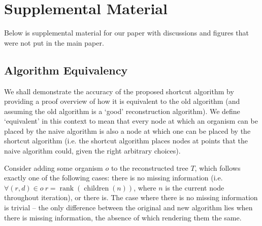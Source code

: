 \appendix
\section*{\Huge Supplemental Material}

\setcounter{section}{0}

\makeatletter
\def\@seccntformat#1{\@ifundefined{#1@cntformat}%
   {\csname the#1\endcsname\space}%
   {\csname #1@cntformat\endcsname}}%
\newcommand\section@cntformat{\thesection.\space} %
\makeatother
\renewcommand{\thesection}{S\arabic{section}}

\vspace{0.8em}

Below is supplemental material for our paper \citep{supplemental} with discussions and figures that were not put in the main paper.

\subsection{Algorithm Equivalency}

\label{sec:algorithm:equivalency}

We shall demonstrate the accuracy of the proposed shortcut algorithm by providing a proof overview of how it is equivalent to the old algorithm (and assuming the old algorithm is a `good' reconstruction algorithm).
We define `equivalent' in this context to mean that every node at which an organism can be placed by the naive algorithm is also a node at which one can be placed by the shortcut algorithm (i.e. the shortcut algorithm places nodes at points that the naive algorithm could, given the right arbitrary choices).

Consider adding some organism $o$ to the reconstructed tree $T$, which follows exactly one of the following cases: there is no missing information (i.e. $\forall (r, d) \in o\ r = \operatorname{rank}(\operatorname{children}(n))$, where $n$ is the current node throughout iteration), or there is.
The case where there is no missing information is trivial -- the only difference between the original and new algorithm lies when there is missing information, the absence of which rendering them the same.


